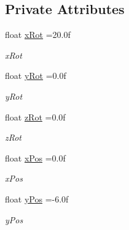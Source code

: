 \subsection*{Private Attributes}
\begin{DoxyCompactItemize}
\item 
\mbox{\label{classGLArea_a9e6ccb31b9276cc6802e4975e6865f10}} 
float \hyperlink{classGLArea_a9e6ccb31b9276cc6802e4975e6865f10}{x\+Rot} =20.\+0f
\begin{DoxyCompactList}\small\item\em x\+Rot \end{DoxyCompactList}\item 
\mbox{\label{classGLArea_aef59623ef883589d4c0a0f2b556f6f85}} 
float \hyperlink{classGLArea_aef59623ef883589d4c0a0f2b556f6f85}{y\+Rot} =0.\+0f
\begin{DoxyCompactList}\small\item\em y\+Rot \end{DoxyCompactList}\item 
\mbox{\label{classGLArea_a8fcd59d1fc2863c7a543777aa1471b6d}} 
float \hyperlink{classGLArea_a8fcd59d1fc2863c7a543777aa1471b6d}{z\+Rot} =0.\+0f
\begin{DoxyCompactList}\small\item\em z\+Rot \end{DoxyCompactList}\item 
\mbox{\label{classGLArea_abae89a1d81c11c64534649dfebff9809}} 
float \hyperlink{classGLArea_abae89a1d81c11c64534649dfebff9809}{x\+Pos} =0.\+0f
\begin{DoxyCompactList}\small\item\em x\+Pos \end{DoxyCompactList}\item 
\mbox{\label{classGLArea_ad7c6f9b56b3bd72859ffa9ba82e44bb1}} 
float \hyperlink{classGLArea_ad7c6f9b56b3bd72859ffa9ba82e44bb1}{y\+Pos} =-\/6.\+0f
\begin{DoxyCompactList}\small\item\em y\+Pos \end{DoxyCompactList}\item 
\mbox{\label{classGLArea_ae0a96496d46cc99c08820a06529db66a}} 

\end{DoxyCompactItemize}
